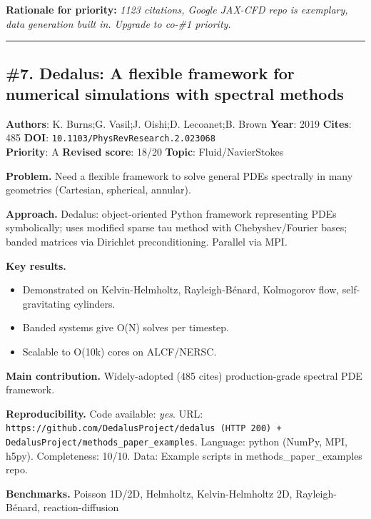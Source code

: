 \documentclass[10pt,letterpaper]{article}
\begin{document}
\textbf{Rationale for priority:} \emph{1123 citations, Google JAX-CFD repo is exemplary, data generation built in. Upgrade to co-\#1 priority.}

\medskip\hrule\medskip

\subsection*{\#7. Dedalus: A flexible framework for numerical simulations with spectral methods}
\textbf{Authors}: K. Burns;G. Vasil;J. Oishi;D. Lecoanet;B. Brown \textbullet{} \textbf{Year}: 2019 \textbullet{} \textbf{Cites}: 485 \textbullet{} \textbf{DOI}: \texttt{10.1103/PhysRevResearch.2.023068} \\
\textbf{Priority}: A \textbullet{} \textbf{Revised score}: 18/20 \textbullet{} \textbf{Topic}: Fluid/NavierStokes

\textbf{Problem.} Need a flexible framework to solve general PDEs spectrally in many geometries (Cartesian, spherical, annular).

\textbf{Approach.} Dedalus: object-oriented Python framework representing PDEs symbolically; uses modified sparse tau method with Chebyshev/Fourier bases; banded matrices via Dirichlet preconditioning. Parallel via MPI.

\textbf{Key results.}
\begin{itemize}
\item Demonstrated on Kelvin-Helmholtz, Rayleigh-Bénard, Kolmogorov flow, self-gravitating cylinders.
\item Banded systems give O(N) solves per timestep.
\item Scalable to O(10k) cores on ALCF/NERSC.
\end{itemize}

\textbf{Main contribution.} Widely-adopted (485 cites) production-grade spectral PDE framework.

\textbf{Reproducibility.} Code available: \emph{yes}. URL: \texttt{https://github.com/DedalusProject/dedalus (HTTP 200) + DedalusProject/methods\_paper\_examples}. Language: python (NumPy, MPI, h5py). Completeness: 10/10. Data: Example scripts in methods\_paper\_examples repo.

\textbf{Benchmarks.} Poisson 1D/2D, Helmholtz, Kelvin-Helmholtz 2D, Rayleigh-Bénard, reaction-diffusion
\end{document}
